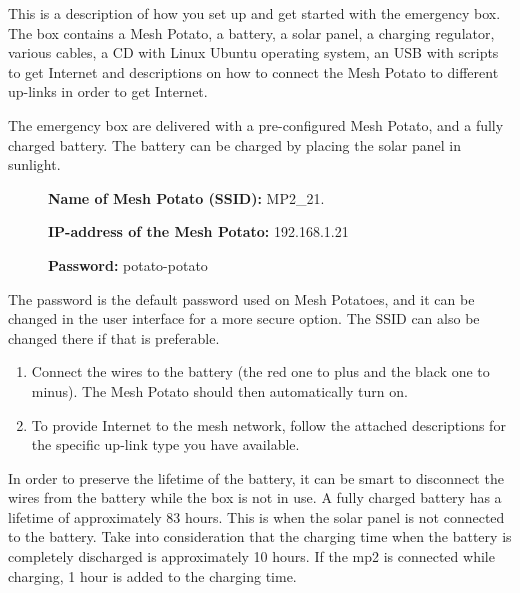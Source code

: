 This is a description of how you set up and get started with the emergency box. The box contains a Mesh Potato, a battery, a solar panel, a charging regulator, various cables, a CD with Linux Ubuntu operating system, an USB with scripts to get Internet and descriptions on how to connect the Mesh Potato to different up-links in order to get Internet. 

The emergency box are delivered with a pre-configured Mesh Potato, and a fully charged battery. The battery can be charged by placing the solar panel in sunlight. 

\begin{description}
\item[] \textbf{Name of Mesh Potato (SSID):} MP2_21.
\item[] \textbf{IP-address of the Mesh Potato:} 192.168.1.21
\item[] \textbf{Password:} potato-potato 
\end{description}

The password is the default password used on Mesh Potatoes, and it can be changed in the user interface for a more secure option. The SSID can also be changed there if that is preferable. 

\begin{enumerate}
\item Connect the wires to the battery (the red one to plus and the black one to minus). The Mesh Potato should then automatically turn on. 
\item To provide Internet to the mesh network, follow the attached descriptions for the specific up-link type you have available. 
\end{enumerate} 

In order to preserve the lifetime of the battery, it can be smart to disconnect the wires from the battery while the box is not in use. A fully charged battery has a lifetime of approximately 83 hours. This is when the solar panel is not connected to the battery. Take into consideration that the charging time when the battery is completely discharged is approximately 10 hours. If the \gls{mp2} is connected while charging, 1 hour is added to the charging time. 